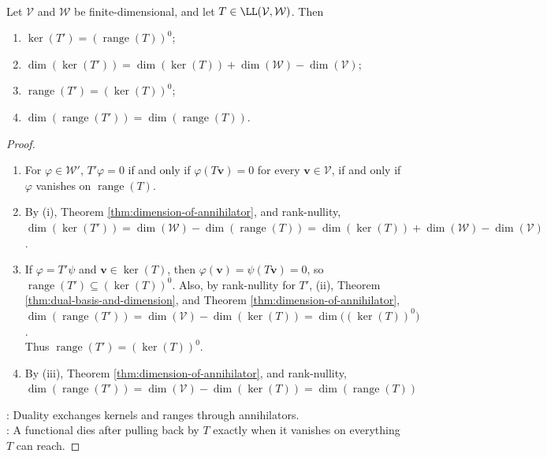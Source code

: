 \begin{theorem} \label{thm:dual-kernel-range-annihilator} \\
Let $\mathcal{V}$ and $\mathcal{W}$ be finite-dimensional, and let $T\in\LL(\mathcal{V},\mathcal{W})$. Then
\begin{enumerate}[label=(\roman*)]
\setlength{\itemsep}{0pt}
\item $\ker(T')=(\operatorname{range}(T))^0$;
\item $\dim(\ker(T'))=\dim(\ker(T))+\dim(\mathcal{W})-\dim(\mathcal{V})$;
\item $\operatorname{range}(T')=(\ker(T))^0$;
\item $\dim(\operatorname{range}(T'))=\dim(\operatorname{range}(T))$.
\end{enumerate}
\begin{proof}
\begin{enumerate}[label=(\roman*)]
\setlength{\itemsep}{0pt}
\item For $\varphi\in\mathcal{W}'$, $T'\varphi=0$ if and only if $\varphi(T\mathbf{v})=0$ for every $\mathbf{v}\in\mathcal{V}$, if and only if $\varphi$ vanishes on $\operatorname{range}(T)$.
\item By (i), Theorem \ref{thm:dimension-of-annihilator}, and rank-nullity,\\
$\dim(\ker(T'))=\dim(\mathcal{W})-\dim(\operatorname{range}(T)) =\dim(\ker(T))+\dim(\mathcal{W})-\dim(\mathcal{V})$.
\item If $\varphi=T'\psi$ and $\mathbf{v}\in\ker(T)$, then $\varphi(\mathbf{v})=\psi(T\mathbf{v})=0$, so $\operatorname{range}(T')\subseteq(\ker(T))^0$. Also, by rank-nullity for $T'$, (ii), Theorem \ref{thm:dual-basis-and-dimension}, and Theorem \ref{thm:dimension-of-annihilator}, $\dim(\operatorname{range}(T'))=\dim(\mathcal{V})-\dim(\ker(T)) =\dim\big((\ker(T))^0\big)$.\\
Thus $\operatorname{range}(T')=(\ker(T))^0$.
\item By (iii), Theorem \ref{thm:dimension-of-annihilator}, and rank-nullity, $\dim(\operatorname{range}(T'))=\dim(\mathcal{V})-\dim(\ker(T)) =\dim(\operatorname{range}(T))$
\end{enumerate}
: Duality exchanges kernels and ranges through annihilators.\\
: A functional dies after pulling back by $T$ exactly when it vanishes on everything $T$ can reach.
\end{proof}
\end{theorem}

